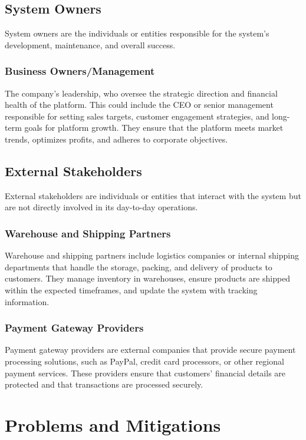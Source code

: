 \documentclass[a4paper,journal]{IEEEtran}
\begin{document}
\subsection{System Owners}
System owners are the individuals or entities responsible for the system's
development, maintenance, and overall success.

\subsubsection{Business Owners/Management}
The company's leadership, who oversee the strategic direction and financial
health of the platform.
This could include the CEO or senior management
responsible for setting sales targets, customer engagement strategies, and
long-term goals for platform growth.
They ensure that the platform meets market
trends, optimizes profits, and adheres to corporate objectives.

\subsection{External Stakeholders}
External stakeholders are individuals or entities that interact with the system
but are not directly involved in its day-to-day operations.

\subsubsection{Warehouse and Shipping Partners}
Warehouse and shipping partners include logistics companies or internal shipping
departments that handle the storage, packing, and delivery of products to
customers.
They manage inventory in warehouses, ensure products are shipped within the
expected timeframes, and update the system with tracking information.

\subsubsection{Payment Gateway Providers}
Payment gateway providers are external companies that provide secure payment
processing solutions, such as PayPal, credit card processors, or other regional
payment services.
These providers ensure that customers' financial details are protected and that
transactions are processed securely.

\section{Problems and Mitigations}
\end{document}
